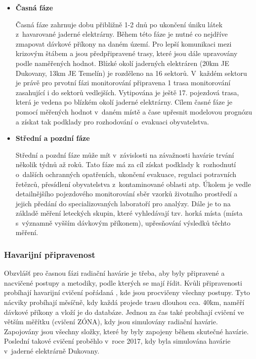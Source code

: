 \begin{itemize}
	\item \textbf{Časná fáze}
	
		Časná fáze zahrnuje dobu přibližně 1-2 dnů po ukončení
úniku látek z~havarované jaderné elektrárny. Během této fáze je nutné
co nejdříve zmapovat dávkové příkony na daném území. Pro lepší
komunikaci mezi krizovým štábem a  jsou předpřipravené trasy,
které jsou dále upravovány podle naměřených hodnot. Blízké okolí
jaderných elektráren (20km JE Dukovany, 13km JE Temelín) je rozděleno
na 16 sektorů. V~každém sektoru je právě pro prvotní fázi monitorování
připravena 1 trasa monitorování zasahující i do sektorů
vedlejších. Vytipována je ještě 17. pojezdová trasa, která je vedena
po blízkém okolí jaderné elektrárny. Cílem časné fáze je pomocí
měřených hodnot v~daném místě a čase upřesnit modelovou prognózu a
získat tak podklady pro rozhodování o~evakuaci obyvatelstva.

	\item \textbf{Střední a pozdní fáze}
		
		Střední a pozdní fáze může mít v~závislosti na
závažnosti havárie trvání několik týdnů až roků. Tato fáze má za cíl
získat podklady k~rozhodnutí o~dalších ochranných opatřeních, ukončení
evakuace, regulaci potravních řetězců, přesídlení obyvatelstva
z~kontaminované oblasti atp. Úkolem  je vedle detailnějšího
pojezdového monitorování sběr vzorků životního prostředí a jejich
předání do specializovaných laboratoří pro analýzy. Dále je to na
základě měření leteckých skupin, které vyhledávají tzv. horká místa
(místa s~významně vyšším dávkovým příkonem), upřesňování výsledků
těchto měření.
\end{itemize}

\subsubsection{Havarijní připravenost}

Obzvlášť pro časnou fázi radiační havárie je třeba, aby byly
připravené a nacvičené postupy a metodiky, podle kterých se 
mají řídit. Kvůli připravenosti probíhají havarijní cvičení pořádaná
, kde jsou procvičeny všechny postupy. Tyto nácviky probíhají
měsíčně, kdy každá  projede trasu dlouhou cca. 40km, naměří
dávkové příkony a vloží je do databáze. Jednou za čas také probíhají
cvičení ve větším měřítku (cvičení ZÓNA), kdy jsou simulovány radiační
havárie. Zapojovány jsou všechny složky, které by byly zapojeny během
skutečné havárie. Poslední takové cvičení proběhlo v~roce 2017, kdy
byla simulována havárie v~jaderné elektrárně Dukovany.

